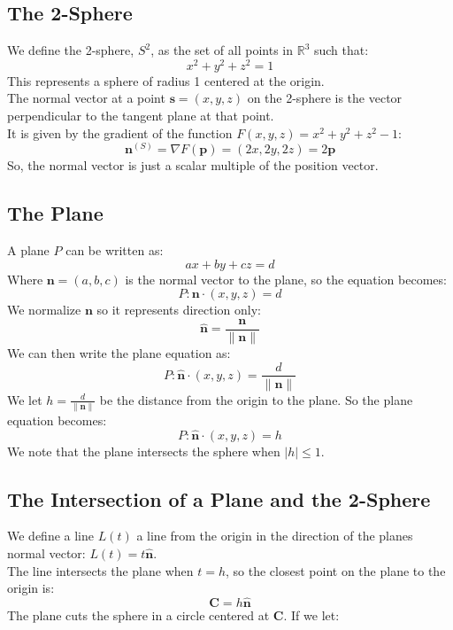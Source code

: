 \documentclass[11pt]{article}
\begin{document}
\newpage

\subsection*{The 2-Sphere}
We define the 2-sphere, $S^2$, as the set of all points in $\mathbb{R}^3$ such that:
$$x^2 + y^2 + z^2 = 1$$
This represents a sphere of radius 1 centered at the origin. \\
The normal vector at a point $\mathbf{s} = (x, y, z)$ on the 2-sphere is the vector perpendicular to the tangent plane at that point. \\
It is given by the gradient of the function $F(x,y,z) = x^2 + y^2 + z^2 - 1$:
$$\mathbf{n}^{(S)} = \nabla F(\mathbf{p}) = (2x, 2y, 2z) = 2\textbf{p}$$
So, the normal vector is just a scalar multiple of the position vector.
\subsection*{The Plane}
A plane $P$ can be written as:
$$ax + by + cz = d$$
Where $\textbf{n} = (a,b,c)$ is the normal vector to the plane, so the equation becomes:
$$P : \textbf{n} \cdot (x,y,z) = d$$
We normalize $\textbf{n}$ so it represents direction only:
$$\hat{\textbf{n}} = \frac{\textbf{n}}{\|\textbf{n}\|}$$
We can then write the plane equation as:
$$P : \hat{\textbf{n}} \cdot (x,y,z) = \frac{d}{\|\textbf{n}\|}$$
We let $h = \frac{d}{\|\textbf{n}\|}$ be the distance from the origin to the plane.
So the plane equation becomes:
$$P : \hat{\textbf{n}} \cdot (x,y,z) = h$$
We note that the plane intersects the sphere when $|h| \leq 1$.
\newpage
\subsection*{The Intersection of a Plane and the 2-Sphere}
We define a line $L(t)$ a line from the origin in the direction of the planes normal vector: $L(t) = t \hat{\textbf{n}}$. \\
The line intersects the plane when $t= h$, so the closest point on the plane to the origin is:
$$\mathbf{C} = h \hat{\mathbf{n}}
$$
The plane cuts the sphere in a circle centered at $\mathbf{C}$.
If we let:
\noindent
\end{document}
